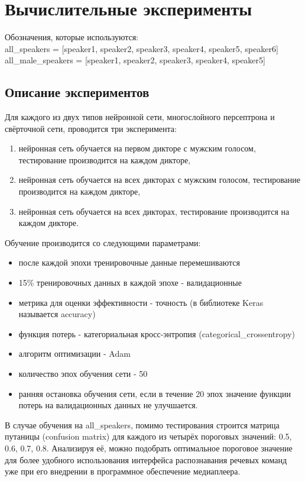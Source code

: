 \section{Вычислительные эксперименты}
Обозначения, которые используются: \\
all\_speakers = [speaker1, speaker2, speaker3, speaker4, speaker5, speaker6] \\
all\_male\_speakers = [speaker1, speaker2, speaker3, speaker4, speaker5]
\subsection{Описание экспериментов}
Для каждого из двух типов нейронной сети, многослойного персептрона и свёрточной сети, проводится три эксперимента:
\begin{enumerate}[leftmargin=2cm]
	\item нейронная сеть обучается на первом дикторе с мужским голосом, тестирование производится на каждом дикторе,
	\item нейронная сеть обучается на всех дикторах с мужским голосом, тестирование производится на каждом дикторе,
	\item нейронная сеть обучается на всех дикторах, тестирование производится на каждом дикторе.
\end{enumerate}

Обучение производится со следующими параметрами:
\begin{itemize}[leftmargin=2cm]
	\item после каждой эпохи тренировочные данные перемешиваются
	\item 15\% тренировочных данных в каждой эпохе - валидационные
	\item метрика для оценки эффективности - точность (в библиотеке Keras называется accuracy)
	\item функция потерь - категориальная кросс-энтропия (categorical\_crossentropy)
	\item алгоритм оптимизации - Adam
	\item количество эпох обучения сети - 50
	\item ранняя остановка обучения сети, если в течение 20 эпох значение функции потерь на валидационных данных не улучшается.
\end{itemize}

В случае обучения на all\_speakers, помимо тестирования строится матрица путаницы (confusion matrix) для каждого из четырёх пороговых значений: 0.5, 0.6, 0.7, 0.8. Анализируя её, можно подобрать оптимальное пороговое значение для более удобного использования интерфейса распознавания речевых команд уже при его внедрении в программное обеспечение медиаплеера.

